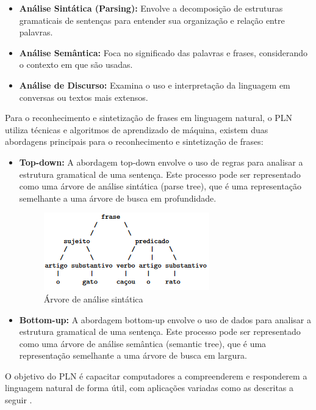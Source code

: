\documentclass[conference]{IEEEtran}
\begin{document}
\begin{itemize}
\item \textbf{Análise Sintática (Parsing):} Envolve a decomposição de estruturas gramaticais de sentenças para entender sua organização e relação entre palavras.
\item \textbf{Análise Semântica:} Foca no significado das palavras e frases, considerando o contexto em que são usadas.
\item \textbf{Análise de Discurso:} Examina o uso e interpretação da linguagem em conversas ou textos mais extensos.
\end{itemize}

Para o reconhecimento e sintetização de frases em linguagem natural, o PLN utiliza técnicas e algoritmos
de aprendizado de máquina, existem duas abordagens principais para o reconhecimento e sintetização de frases:
\begin{itemize}
    \item {\textbf{Top-down:}}
    A abordagem top-down envolve o uso de regras para analisar a estrutura gramatical de uma sentença. Este
    processo pode ser representado como uma árvore de análise sintática (parse tree), que é uma representação
    semelhante a uma árvore de busca em profundidade.

    \begin{figure}[htbp]
        \centerline{\includegraphics[scale=1]{parse_tree.png}}
        \caption{Árvore de análise sintática}
        \label{fig}
    \end{figure}

    \item {\textbf{Bottom-up:}}
    A abordagem bottom-up envolve o uso de dados para analisar a estrutura gramatical de uma sentença. Este
    processo pode ser representado como uma árvore de análise semântica (semantic tree), que é uma representação
    semelhante a uma árvore de busca em largura.

\end{itemize}

O objetivo do PLN é capacitar computadores a compreenderem e responderem a linguagem natural de forma útil, 
com aplicações variadas como as descritas a seguir \cite{Jurafsky2019}.
\end{document}
